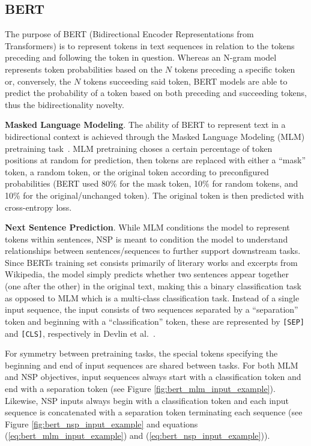 \documentclass[12pt]{article}
\begin{document}
\subsection{BERT}\label{sec:bert}
The purpose of BERT (Bidirectional Encoder Representations from Transformers) is to represent tokens in text sequences in relation to the tokens
preceding and following the token in question. Whereas an N-gram model represents token probabilities based on the $N$ tokens preceding a specific
token or, conversely, the $N$ tokens succeeding said token, BERT models are able to predict the probability of a token based on both preceding and
succeeding tokens, thus the bidirectionality novelty.

\textbf{Masked Language Modeling}. The ability of BERT to represent text in a bidirectional context is achieved through the Masked Language Modeling
(MLM) pretraining task~\cite{devlin_bert_2019}. MLM pretraining choses a certain percentage of token positions at random for prediction, then tokens
are replaced with either a ``mask'' token, a random token, or the original token according to preconfigured probabilities (BERT used 80\% for the mask
token, 10\% for random tokens, and 10\% for the original/unchanged token). The original token is then predicted with cross-entropy loss.

\textbf{Next Sentence Prediction}. While MLM conditions the model to represent tokens within sentences, NSP is meant to condition the model to
understand relationships between sentences/sequences to further support downstream tasks. Since BERTs training set consists primarily of literary
works and excerpts from Wikipedia, the  model simply predicts whether two sentences appear together (one after the other) in the original text,
making this a binary classification task as opposed to MLM which is a multi-class classification task. Instead of a single input sequence, the input
consists of two sequences separated by a ``separation'' token and beginning with a ``classification'' token, these are represented by
\lstinline|[SEP]| and \lstinline|[CLS]|, respectively in Devlin et al.~\cite{devlin_bert_2019}.

For symmetry between pretraining tasks, the special tokens specifying the beginning and end of input sequences are shared between tasks. For both MLM
and NSP objectives, input sequences always start with a classification token and end with a separation token (see Figure
\ref{fig:bert_mlm_input_example}). Likewise, NSP inputs always begin with a classification token and each input sequence is concatenated with a
separation token terminating each sequence (see Figure \ref{fig:bert_nsp_input_example} and equations (\ref{eq:bert_mlm_input_example}) and
(\ref{eq:bert_nsp_input_example})).
\end{document}
